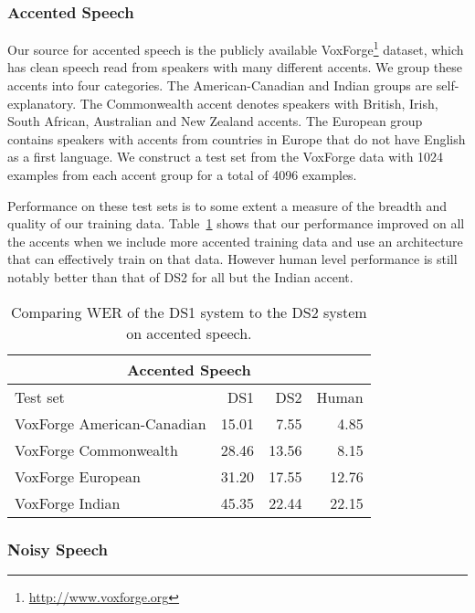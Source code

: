 \subsubsection{Accented Speech}

Our source for accented speech is the publicly available
VoxForge\footnote{\url{http://www.voxforge.org}} dataset, which has clean
speech read from speakers with many different accents. We group these accents
into four categories. The American-Canadian and Indian groups are
self-explanatory. The Commonwealth accent denotes speakers with British, Irish,
South African, Australian and New Zealand accents. The European group contains
speakers with accents from countries in Europe that do not have English as a
first language.  We construct a test set from the VoxForge data with 1024
examples from each accent group for a total of 4096 examples.

Performance on these test sets is to some extent a measure of the breadth and
quality of our training data. Table~\ref{table:deepspeech2:voxforge} shows that
our performance improved on all the accents when we include more accented
training data and use an architecture that can effectively train on that data.
However human level performance is still notably better than that of DS2 for
all but the Indian accent. 

\begin{table}
\centering
\begin{tabular}{l  r  r  r}
\toprule
\multicolumn{4}{c}{Accented Speech}\\
\midrule
Test set                   & DS1   & DS2 & Human \\
\midrule
VoxForge American-Canadian & 15.01 & 7.55  & 4.85 \\
VoxForge Commonwealth      & 28.46 & 13.56 & 8.15 \\
VoxForge European          & 31.20 & 17.55 & 12.76 \\
VoxForge Indian            & 45.35 & 22.44 & 22.15 \\
\bottomrule
\end{tabular}
\caption{Comparing WER of the DS1 system to the DS2 system on accented speech.}
\label{table:deepspeech2:voxforge}
\end{table}

\subsubsection{Noisy Speech}

